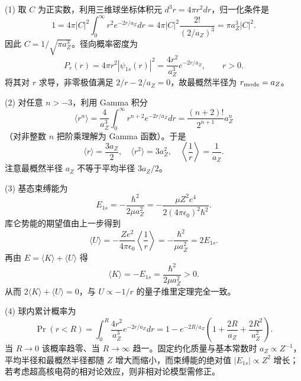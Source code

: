 (1) 取 \(C\) 为正实数，利用三维球坐标体积元 \(d^3r=4\pi r^2dr\)，归一化条件是
\[
1=4\pi |C|^2\int_0^\infty r^2e^{-2r/a_Z}dr
=4\pi|C|^2\frac{2!}{(2/a_Z)^3}
=\pi a_Z^3|C|^2.
\]
因此 \(C=1/\sqrt{\pi a_Z^3}\)。径向概率密度为
\[
P_r(r)=4\pi r^2|\psi_{1s}(r)|^2
=\frac{4r^2}{a_Z^3}e^{-2r/a_Z},\qquad r>0.
\]
将其对 \(r\) 求导，非零极值满足 \(2/r-2/a_Z=0\)，故最概然半径为 \(r_{\rm mode}=a_Z\)。

(2) 对任意 \(n>-3\)，利用 Gamma 积分
\[
\langle r^n\rangle=
\frac4{a_Z^3}\int_0^\infty r^{n+2}e^{-2r/a_Z}dr
=\frac{(n+2)!}{2^{n+1}}a_Z^n
\]
（对非整数 \(n\) 把阶乘理解为 Gamma 函数）。于是
\[
\langle r\rangle=\frac{3a_Z}{2},\quad
\langle r^2\rangle=3a_Z^2,\quad
\left\langle\frac1r\right\rangle=\frac1{a_Z}.
\]
注意最概然半径 \(a_Z\) 不等于平均半径 \(3a_Z/2\)。

(3) 基态束缚能为
\[
E_{1s}=-\frac{\hbar^2}{2\mu a_Z^2}
=-\frac{\mu Z^2e^4}{2(4\pi\epsilon_0)^2\hbar^2}.
\]
库仑势能的期望值由上一步得到
\[
\langle U\rangle=-\frac{Ze^2}{4\pi\epsilon_0}
\left\langle\frac1r\right\rangle
=-\frac{\hbar^2}{\mu a_Z^2}=2E_{1s}.
\]
再由 \(E=\langle K\rangle+\langle U\rangle\) 得
\[
\langle K\rangle=-E_{1s}=\frac{\hbar^2}{2\mu a_Z^2}>0.
\]
从而 \(2\langle K\rangle+\langle U\rangle=0\)，与 \(U\propto-1/r\) 的量子维里定理完全一致。

(4) 球内累计概率为
\[
\Pr(r<R)=\int_0^R\frac{4r^2}{a_Z^3}e^{-2r/a_Z}dr
=1-e^{-2R/a_Z}\left(1+\frac{2R}{a_Z}+\frac{2R^2}{a_Z^2}\right).
\]
当 \(R\to0\) 该概率趋零、当 \(R\to\infty\) 趋一。固定约化质量与基本常数时 \(a_Z\propto Z^{-1}\)，平均半径和最概然半径都随 \(Z\) 增大而缩小，而束缚能的绝对值 \(|E_{1s}|\propto Z^2\) 增长；若考虑超高核电荷的相对论效应，则非相对论模型需修正。
